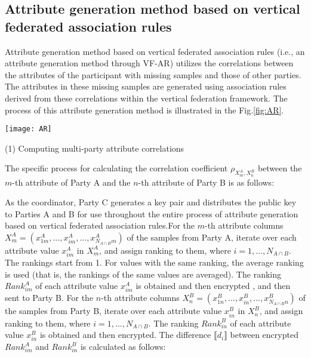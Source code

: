 \documentclass[final,1p,times]{elsarticle}
\begin{document}
\subsection{Attribute generation method based on vertical federated association rules }
\label{subsec32}
Attribute generation method based on vertical federated association rules (i.e., an attribute generation method through VF-AR) utilizes the correlations between the attributes of the participant with missing samples and those of other parties. The attributes in these missing samples are generated using association rules derived from these correlations within the vertical federation framework. The process of this attribute generation method is illustrated in the Fig.\ref{fig:AR}.
\begin{figure*}[t]
	\centering 
	\texttt{[image: AR]}%
	\caption{The process of the attribute generation method based on VF-AR (Taking Party B as an example)} 
	\label{fig:AR}
\end{figure*}

(1) Computing multi-party attribute correlations

The specific process for calculating the correlation coefficient $\rho_{X_m^A,X_n^B}$ between the $m$-th attribute of Party A and the $n$-th attribute of Party B is as follows:

As the coordinator, Party C generates a key pair and distributes the public key to Parties A and B for use throughout the entire process of attribute generation based on vertical federated association rules.For the $m$-th attribute columns $X_{m}^{A}=(x_{1m}^{A},...,x_{im}^{A},...,x_{N_{{A}\cap {B}}m}^{A})$ of the samples from Party A, iterate over each attribute value $x_{im}^A$ in $X_m^A$, and assign ranking to them, where $i=1,...,N_{{A}\cap {B}}$. The rankings start from 1. For values with the same ranking, the average ranking is used (that is, the rankings of the same values are averaged). The ranking $Rank_{im}^A$ of each attribute value $x_{im}^A$ is obtained and then encrypted , and then sent to Party B. For the $n$-th attribute columns $X_n^B=(x_{1n}^B,...,x_{in}^B,...,x_{N_{A\cap B}n}^B)$ of the samples from Party B, iterate over each attribute value $x_{in}^B$ in $X_n^B$, and assign ranking to them, where $i=1,...,N_{{A} \cap {B}}$. The ranking $Rank_{in}^B$ of each attribute value $x_{in}^B$ is obtained and then encrypted. The difference $ \llbracket d_i \rrbracket $ between encrypted $Rank_{im}^A$ and $Rank_{in}^B$ is calculated as follows:
\end{document}
